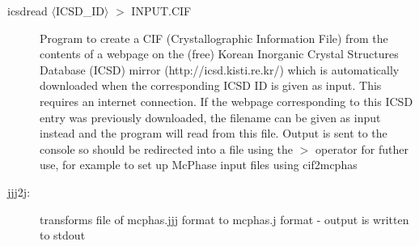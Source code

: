\begin{description}
\item[\prg icsdread $\langle$ICSD\_ID$\rangle$ $>$ INPUT.CIF] 
Program to create a CIF (Crystallographic Information File) from the contents of a webpage on the (free)
Korean Inorganic Crystal Structures Database (ICSD) mirror (http://icsd.kisti.re.kr/) which is automatically 
downloaded when the corresponding ICSD ID is given as input. This requires an internet connection. If the 
webpage corresponding to this ICSD entry was previously downloaded, the filename can be given as input instead
and the program will read from this file. Output is sent to the console so should be redirected into a file
using the {\prg $>$} operator for futher use, for example to set up McPhase input files using {\prg cif2mcphas}

\item [\prg jjj2j:] transforms file of {\prg mcphas.jjj} format to {\prg %
mcphas.j} format
- output is written to stdout


\end{description}
